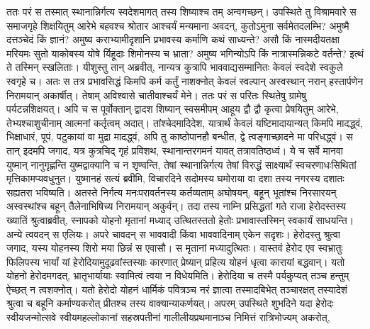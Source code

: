 \adhyAya
{}
\vakya ततः परं स तस्मात् स्थानान्निर्गत्य स्वदेशमागत् तस्य शिष्याश्च तम् अन्वगच्छन्।
\vakya उपस्थिते तु विश्रामवारे स समाजगृहे शिक्षयितुम् आरेभे बहवश्च श्रोतार आश्चर्यं मन्यमाना अवदन्, कुतोऽमुना सर्वमेतदलम्भि? अमुष्मै दत्तञ्चेदं किं ज्ञानं? अमुष्य कराभ्यामीदृशानि प्रभावस्य कर्माणि कथं साध्यन्ते?
\vakya असौ किं नास्मदीयतक्षा मरियमः सुतो याकोबस्य योषे र्यिहूदाः शिमोनस्य च भ्राता? अमुष्य भगिन्योऽपि किं नात्रास्मन्निकटे वर्तन्ते? इत्थं ते तस्मिन् स्खलिताः।
\vakya यीशुस्तु तान् अब्रवीत्, नान्यत्र कुत्रापि भाववाद्यसम्मानितः केवलं स्वदेशे स्वकुले स्वगृहे च।
\vakya अतः स तत्र प्रभावसिद्धं किमपि कर्म कर्तुं नाशक्नोत् केवलं स्वल्पान् अस्वस्थान् नरान् हस्तार्पणेन निरामयान् अकार्षीत्। तेषाम् अविश्वासे चातीवाश्चर्यं मेने।
\vakya ततः परं स परितः स्थितेषु ग्रामेषु पर्यटन्नशिक्षयत्।
\vakya अपि च स पूर्वोक्तान् द्वादश शिष्यान् स्वसमीपम् आहूय द्वौ द्वौ कृत्वा प्रेषयितुम् आरेभे, तेभ्यश्चाशुचीनाम् आत्मनां कर्तृत्वम् अदात्।
\vakya तांश्चेदमादिदेश, यात्रार्थं केवलं यष्टिमादायान्यत् किमपि मादद्ध्वं, भिक्षाधारं, पूपं, पटुकायां वा मुद्रा मादद्ध्वं,
\vakya अपि तु काष्ठोपानहौ बन्धीत, द्वे त्वङ्गाच्छादने मा परिधद्ध्वं।
\vakya स तान् इदमपि जगाद, यत्र कुत्रचिद् गृहं प्रविशथ, स्थानान्तरगमनं यावत् तत्रावतिष्ठध्वं।
\vakya ये च सर्वे मानवा युष्मान् नानुगृह्णन्ति युष्मद्वाक्यानि च न शृण्वन्ति, तेषां स्थानान्निर्गत्य तेषां विरुद्धं साक्ष्यार्थं स्वचरणाधःसिथितां मृत्तिकामप्यवधुनुत। युष्मानहं सत्यं ब्रवीमि, विचारदिने सदोमस्य घमोराया वा दशा तस्य नगरस्य दशातः सह्यतरा भविष्यति।
\vakya अतस्ते निर्गत्य मनःपरावर्तनस्य कर्तव्यताम् अघोषयन्,
\vakya बहून् भूतांश्च निरसारयन् अस्वस्थांश्च बहून् तैलेनाभिषिच्य निरामयान् अकुर्वन्।
\vakya तदा तस्य नाम्नि प्रसिद्धतां गते राजा हेरोदस्तस्य ख्यातिं श्रुत्वाब्रवीत्, स्नापको योहनो मृतानां मध्याद् उत्थितस्ततो हेतोः प्रभावास्तस्मिन् स्वकार्यं साधयन्ति।
\vakya अन्ये त्ववदन् स एलियः। अपरे चावदन् स भाववादी किंवा भाववादिनाम् एकेन सदृशः।
\vakya हेरोदस्तु श्रुत्वा जगाद, यस्य योहनस्य शिरो मया छिन्नं स एवासौ। स मृतानां मध्यादुत्थितः।
\vakya वास्तवं हेरोद एव स्वभ्रातुः फिलिपस्य भार्यां यां हेरोदियामुदूढवांस्तस्याः कारणात् प्रेष्यान् प्रहित्य योहनं धृत्वा कारायां बद्धवान्।
\vakya यतो योहनो हेरोदमगदत्, भ्रातृभार्यायाः स्वामित्वं त्वया न विधेयमिति।
\vakya हेरोदिया च तस्मै पर्यकुप्यत् तञ्च हन्तुम् ऐच्छत् न त्वशक्नोत्।
\vakya यतो हेरोदो योहनं धार्मिकं पवित्रञ्च नरं ज्ञात्वा तस्मादबिभेत् तञ्चारक्षत् तस्यादेशं श्रुत्वा च बहूनि कर्माण्यकरोत् प्रीतश्च तस्य वाक्यान्याकर्णयत्।
\vakya अपरम् उपस्थिते शुभदिने यदा हेरोदः स्वीयजन्मोत्सवे स्वीयमहल्लोकानां सहस्रपतीनां गालीलीयप्रथमानाञ्च निमित्तं रात्रिभोज्यम् अकरोत्,
